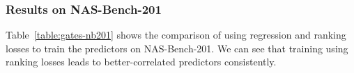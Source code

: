 \documentclass[runningheads]{llncs}
\begin{document}
\subsubsection{Results on NAS-Bench-201}
Table~\ref{table:gates-nb201} shows the comparison of using regression and ranking losses to train the predictors on NAS-Bench-201. We can see that training using ranking losses leads to better-correlated predictors consistently.
\end{document}

